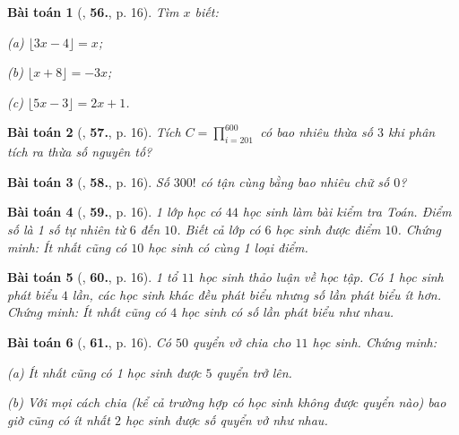\documentclass{article}
\numberwithin{equation}{section}
\newtheorem{baitoan}{Bài toán}[section]
\begin{document}
\begin{baitoan}[\cite{Tuyen_Toan_7}, \textbf{56.}, p. 16]
	Tìm $x$ biết:
	\begin{enumerate*}
		\item[(a)] $\lfloor 3x - 4\rfloor = x$;
		\item[(b)] $\lfloor x + 8\rfloor = -3x$;
		\item[(c)] $\lfloor 5x - 3\rfloor = 2x + 1$.
	\end{enumerate*}
\end{baitoan}

\begin{baitoan}[\cite{Tuyen_Toan_7}, \textbf{57.}, p. 16]
	Tích $C = \prod_{i=201}^{600}$ có bao nhiêu thừa số $3$ khi phân tích ra thừa số nguyên tố?
\end{baitoan}

\begin{baitoan}[\cite{Tuyen_Toan_7}, \textbf{58.}, p. 16]
	Số $300!$ có tận cùng bằng bao nhiêu chữ số $0$?
\end{baitoan}

\begin{baitoan}[\cite{Tuyen_Toan_7}, \textbf{59.}, p. 16]
	1 lớp học có $44$ học sinh làm bài kiểm tra Toán. Điểm số là 1 số tự nhiên từ $6$ đến $10$. Biết cả lớp có $6$ học sinh được điểm $10$. Chứng minh: Ít nhất cũng có $10$ học sinh có cùng 1 loại điểm.
\end{baitoan}

\begin{baitoan}[\cite{Tuyen_Toan_7}, \textbf{60.}, p. 16]
	1 tổ $11$ học sinh thảo luận về học tập. Có 1 học sinh phát biểu $4$ lần, các học sinh khác đều phát biểu nhưng số lần phát biểu ít hơn. Chứng minh: Ít nhất cũng có $4$ học sinh có số lần phát biểu như nhau.
\end{baitoan}

\begin{baitoan}[\cite{Tuyen_Toan_7}, \textbf{61.}, p. 16]
	Có $50$ quyển vở chia cho $11$ học sinh. Chứng minh:
	\begin{enumerate*}
		\item[(a)] Ít nhất cũng có 1 học sinh được $5$ quyển trở lên.
		\item[(b)] Với mọi cách chia (kể cả trường hợp có học sinh không được quyển nào) bao giờ cũng có ít nhất $2$ học sinh được số quyển vở như nhau.
	\end{enumerate*}
\end{baitoan}

\end{document}
